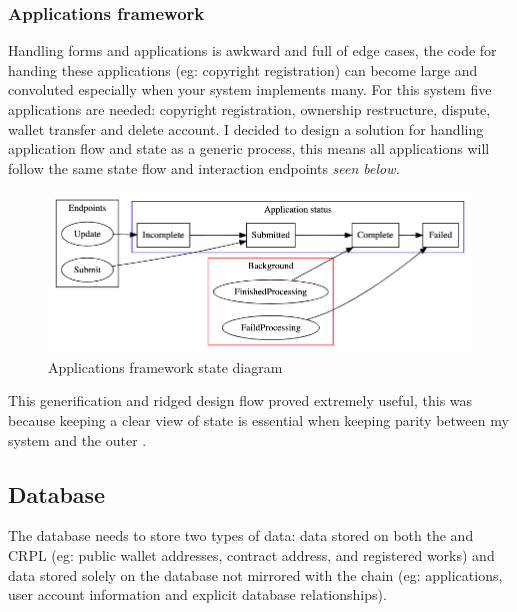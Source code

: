 \subsubsection{Applications framework}

Handling forms and applications is awkward and full of edge cases, the code for handing these applications (eg: copyright registration) can become large and convoluted especially when your system implements many. For this system five applications are needed: copyright registration, ownership restructure, dispute, wallet transfer and delete account. I decided to design a solution for handling application flow and state as a generic process, this means all applications will follow the same state flow and interaction endpoints \textit{seen below.} 

\begin{figure}[H]
\caption{Applications framework state diagram}
\centering
\includegraphics[width=\textwidth,height=0.5\textheight,keepaspectratio]{images/operational/applications-status}
\end{figure}

This generification and ridged design flow proved extremely useful, this was because keeping a clear view of state is essential when keeping parity between my system and the outer .

\subsection{Database}

The database needs to store two types of data: data stored on both the  and CRPL (eg: public wallet addresses, contract address, and registered works) and data stored solely on the database not mirrored with the chain (eg: applications, user account information and explicit database relationships).

